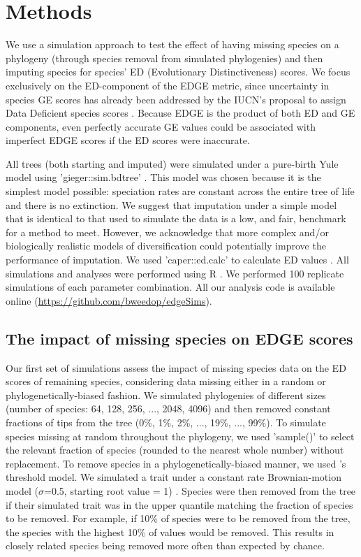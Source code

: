\documentclass[10pt,english]{article}
\begin{document}
\section*{Methods}

We use a simulation approach to test the effect of having missing species
on a phylogeny (through species removal from simulated phylogenies) and then
imputing species for species’ ED (Evolutionary Distinctiveness) scores. We focus
exclusively on the ED-component of the EDGE metric, since uncertainty in species
GE scores has already been addressed by the IUCN’s proposal to assign Data
Deficient species scores \autocite{Iucn2001, Iucn2008}. Because EDGE is the
product of both ED and GE components, even perfectly accurate GE values could be
associated with imperfect EDGE scores if the ED scores were inaccurate.

All trees (both starting and
imputed) were simulated under a pure-birth Yule model using 'gieger::sim.bdtree'
\autocite[setting parameters \texttt{b=1} and \texttt{d=0};][]{Pennell2014}.
This model was chosen because it is the simplest model possible: speciation
rates are constant across the entire tree of life and there is no extinction. We
suggest that imputation under a simple model that is identical to that used to
simulate the data is a low, and fair, benchmark for a method to meet. However,
we acknowledge that more complex and/or biologically realistic models of
diversification could potentially improve the performance of imputation.
We used
'caper::ed.calc' to calculate ED values \autocite{Orme2013}. All simulations and
analyses were performed using R \autocite[version 3.4.0;][]{R2017}.
We performed 100 replicate
simulations of each parameter combination. All our
analysis code is available online (\url{https://github.com/bweedop/edgeSims}).

\subsection*{The impact of missing species on EDGE scores}
Our first set of simulations assess the impact of missing species data on the ED
scores of remaining species, considering data missing either in a random or
phylogenetically-biased fashion. We simulated phylogenies of different sizes
(number of species: 64, 128, 256, ..., 2048, 4096) and then removed constant
fractions of tips from the tree (0\%, 1\%, 2\%, ..., 19\%, ..., 99\%). To
simulate species missing at random throughout the phylogeny, we used 'sample()'
to select the relevant fraction of species (rounded to the nearest whole number)
without replacement. To remove species in a phylogenetically-biased manner, we
used \textcite{Felsenstein2005}'s threshold model. We simulated a trait under a
constant rate Brownian-motion model ($\sigma$=0.5, starting root value = 1)
\autocite[using 'geiger::sim.char'][]{Pennell2014}. Species were then removed
from the tree if their simulated trait was in the upper quantile matching the
fraction of species to be removed. For example, if 10\% of species were to be
removed from the tree, the species with the highest 10\% of values would be
removed. This results in closely related species being removed more often than
expected by chance.
\end{document}
